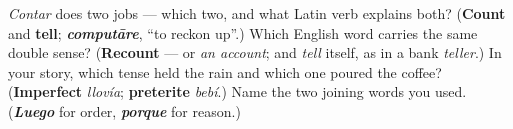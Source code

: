 \begin{tcolorbox}[breakable,colback=teal!4,colframe=teal!35!black,title={Before you move on}]
\emph{Contar} does two jobs — which two, and what Latin verb explains both? (\textbf{Count} and \textbf{tell}; \emph{\textbf{computāre}}, \textquotedblleft{}to reckon up\textquotedblright{}.) Which English word carries the same double sense? (\textbf{Recount} — or \emph{an account}; and \emph{tell} itself, as in a bank \emph{teller}.) In your story, which tense held the rain and which one poured the coffee? (\textbf{Imperfect} \emph{llovía}; \textbf{preterite} \emph{bebí}.) Name the two joining words you used. (\emph{\textbf{Luego}} for order, \emph{\textbf{porque}} for reason.)
\end{tcolorbox}
